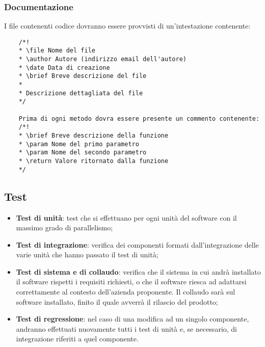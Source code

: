 	\subsubsection{Documentazione}
	I file contenenti codice dovranno essere provvisti di un'intestazione contenente:
	\begin{lstlisting}
    /*!
  	* \file Nome del file
  	* \author Autore (indirizzo email dell'autore)
  	* \date Data di creazione
  	* \brief Breve descrizione del file
  	*
  	* Descrizione dettagliata del file
  	*/
  	
  	Prima di ogni metodo dovra essere presente un commento contenente:
  	/*!
  	* \brief Breve descrizione della funzione
  	* \param Nome del primo parametro
  	* \param Nome del secondo parametro
  	* \return Valore ritornato dalla funzione
  	*/
    \end{lstlisting}
    
  	\subsection{Test}
  	\begin{itemize}
  	
  	
  \item \textbf{Test di unità}: test che si effettuano per ogni unità del software con il massimo grado di parallelismo;
  \item \textbf{Test di integrazione}: verifica dei componenti formati dall’integrazione delle varie unità che hanno passato il test di unità;
  \item \textbf{Test di sistema e di collaudo}: verifica che il sistema in cui andrà installato il software rispetti i requisiti richiesti, o che il software riesca ad adattarsi correttamente al contesto dell’azienda proponente. Il collaudo sarà sul software installato, finito il quale avverrà il rilascio del prodotto;
  \item \textbf{Test di regressione}: nel caso di una modifica ad un singolo componente,
  andranno effettuati nuovamente tutti i test di unità e, se necessario, di
  integrazione riferiti a quel componente.
  \end{itemize}
  